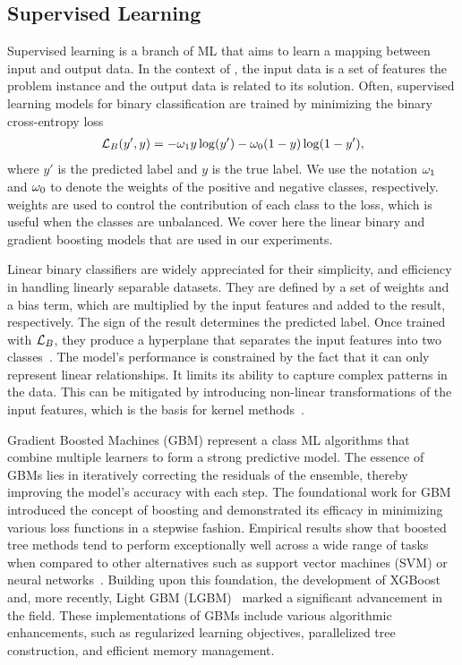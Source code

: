 \documentclass[3p, authoryear, times, doubleblind]{elsarticle}
\begin{document}
{\subsection{Supervised Learning} 
Supervised learning is a branch of ML that aims to learn a mapping between input and output data. In the context of , the input data is a set of features  the problem instance and the output data is related to its solution. Often, supervised learning models for binary classification are trained by minimizing the binary cross-entropy loss %
\begin{align} \label{eq:binloss}
    \mathcal{L}_B (y', y) = -\omega_1 y \log(y') - \omega_0 (1-y) \log(1-y'),
\end{align}
where $y'$ is the predicted label and $y $ is the true label. We use the notation $\omega_1$ and $\omega_0$ to denote the weights of the positive and negative classes, respectively.  weights are used to control the contribution of each class to the loss, which is useful when the classes are unbalanced. We cover here the linear binary and gradient boosting models that are used in our experiments.

Linear binary classifiers are widely appreciated for their simplicity, and efficiency in handling linearly separable datasets. They are defined by a set of weights and a bias term, which are multiplied by the input features and added to the result, respectively. The sign of the result determines the predicted label. Once trained with $\mathcal{L}_B$, they produce a hyperplane that separates the input features into two classes~\citep{hastie_linear_2001}. The model's performance is constrained by the fact that it can only represent linear relationships. It limits its ability to capture complex patterns in the data. This can be mitigated by introducing non-linear transformations of the input features, which is the basis for kernel methods~\citep{hastie_kernel_2001}. 

Gradient Boosted Machines (GBM) represent a class ML algorithms that combine multiple learners to form a  strong predictive model. The essence of GBMs lies in iteratively correcting the residuals of the ensemble, thereby improving the model's accuracy with each step. The foundational work for GBM~\citep{friedman_greedy_2001} introduced the concept of boosting and demonstrated its efficacy in minimizing various loss functions in a stepwise fashion. Empirical results show that boosted tree methods tend to perform exceptionally well across a wide range of tasks when compared to other alternatives such as support vector machines (SVM) or neural networks~\citep{caruana_empirical_2006, borisov_deep_2022_2}. Building upon this foundation, the development of XGBoost~\citep{chen_xgboost_2016} and, more recently, Light GBM (LGBM)~\citep{ke_lightgbm_2017} marked a significant advancement in the field. These implementations of GBMs include various algorithmic enhancements, such as regularized learning objectives, parallelized tree construction, and efficient memory management.

}
\end{document}
